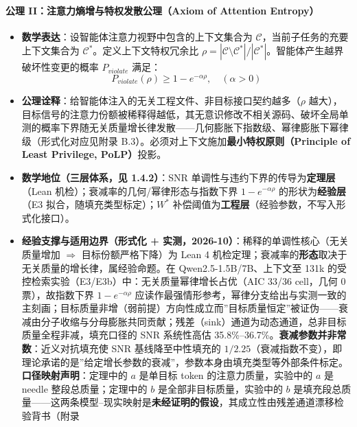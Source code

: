\paragraph{公理 II：注意力熵增与特权发散公理（Axiom of Attention
Entropy）}\label{ux516cux7406-iiux6ce8ux610fux529bux71b5ux589eux4e0eux7279ux6743ux53d1ux6563ux516cux7406axiom-of-attention-entropy}

\begin{itemize}
\tightlist
\item
  \textbf{数学表达}：设智能体注意力视野中包含的上下文集合为
  \(\mathcal{C}\)，当前子任务的充要上下文集合为
  \(\mathcal{C}^*\)。定义上下文特权冗余比
  \(\rho = |\mathcal{C} \setminus \mathcal{C}^*| / |\mathcal{C}^*|\)。智能体产生越界破坏性变更的概率
  \(P_{violate}\) 满足：
  \[ P_{violate}(\rho) \ge 1 - e^{-\alpha \rho}, \quad (\alpha > 0) \]
\item
  \textbf{公理诠释}：给智能体注入的无关工程文件、非目标接口契约越多（\(\rho\)
  越大），目标信号的注意力份额被稀释得越低，其无意识修改不相关源码、破坏全局单测的概率下界随无关质量增长律发散------几何膨胀下指数级、幂律膨胀下幂律级（形式化对应见附录
  B.3）。必须对上下文施加\textbf{最小特权原则（Principle of Least
  Privilege, PoLP）}投影。
\item
  \textbf{数学地位（三层体系，见 1.4.2）}：SNR
  单调性与违约下界的传导为\textbf{定理层}（Lean
  机检）；衰减率的几何/幂律形态与指数下界 \(1-e^{-\alpha\rho}\)
  的形状为\textbf{经验层}（E3 拟合，随填充类型标定）；\(W^*\)
  补偿阈值为\textbf{工程层}（经验参数，不写入形式化接口）。
\item
  \textbf{经验支撑与适用边界（形式化 +
  实测，2026-10）}：稀释的单调性核心（无关质量增加 \(\Rightarrow\)
  目标份额严格下降）为 Lean 4
  机检定理；衰减率的\textbf{形态}取决于无关质量的增长律，属经验命题。在
  Qwen2.5-1.5B/7B、上下文至 131k
  的受控检索实验（E3/E3b）中：无关质量幂律增长占优（AIC 33/36 cell，几何
  0 票），故指数下界 \(1-e^{-\alpha\rho}\)
  应读作最强情形参考，幂律分支给出与实测一致的主刻画；目标质量非增（弱前提）方向性成立而''目标质量恒定''被证伪------衰减由分子收缩与分母膨胀共同贡献；残差（sink）通道为动态通道，总非目标质量全程非减，填充口径的
  SNR 系统性高估
  35.8\%--36.7\%。\textbf{衰减参数并非常数}：近义对抗填充使 SNR
  基线降至中性填充的
  \(1/2.25\)（衰减指数不变），即理论承诺的是''给定增长参数的衰减''，参数本身由填充类型等外部条件标定。\textbf{口径映射声明}：定理中的
  \(a\) 是单目标 token 的注意力质量，实验中的 \(a\) 是 needle
  整段总质量；定理中的 \(b\) 是全部非目标质量，实验中的 \(b\)
  是填充段总质量------这两条模型--现实映射是\textbf{未经证明的假设}，其成立性由残差通道漂移检验背书（附录

\end{itemize}
